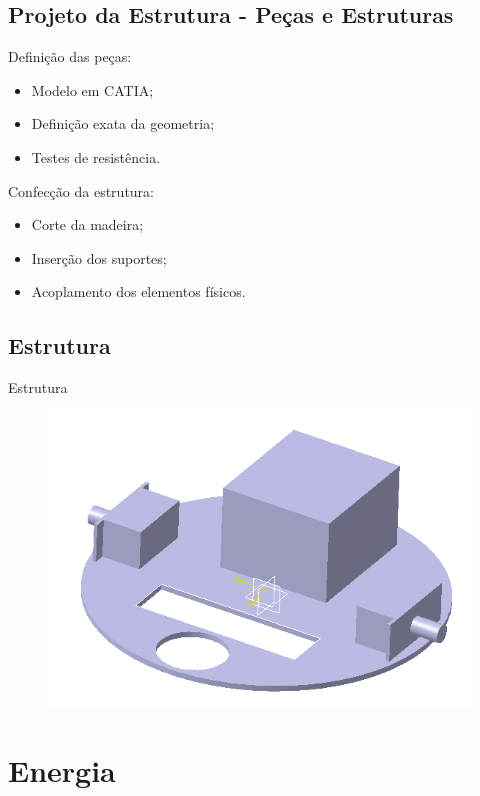\documentclass{beamer}
\begin{document}
\subsection{Projeto da Estrutura - Peças e Estruturas}
\begin{frame}
Definição das peças:
    \begin{itemize}
        \item Modelo em CATIA;
        \item Definição exata da geometria;
        \item Testes de resistência.
    \end{itemize}
    Confecção da estrutura:
    \begin{itemize}
        \item Corte da madeira;
        \item Inserção dos suportes;
        \item Acoplamento dos elementos físicos.
    \end{itemize}
\end{frame}

\subsection{Estrutura}
\begin{frame}
    \centering
    Estrutura    
    \begin{figure}
    \centering
    \includegraphics[width=0.8\linewidth]{automotiva_1}
  \end{figure}
\end{frame}
\section{Energia}
\end{document}

